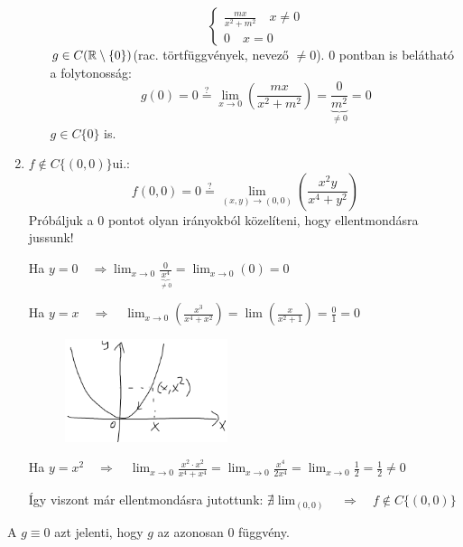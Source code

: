 \documentclass[a4paper,11.5pt]{article}
\begin{document}
\begin{task}
\begin{enumerate}
\begin{enumerate}
\[\begin{cases}
					\frac{mx}{x^2+m^2}\quad x\not=0\\
					0\quad x=0
				\end{cases} \]
				$g\in C(\mathbb{R}\setminus\{0\})$\quad (rac. törtfüggvények, nevező $\not=0$). $0$ pontban is belátható a folytonosság:
				\[ g(0)=0\overset{?}{=}\lim_{x\to0}\left(\frac{mx}{x^2+m^2}\right)=\frac{0}{\underbrace{m^2}_{\not=0}}=0 \]
				$g\in C\{0\}$ is.
			\end{enumerate}
			\item $f\notin C\{ (0,0) \}$\quad ui.:
			\[ f(0,0)=0\overset{?}{=}\lim_{(x,y)\to(0,0)}\left(\frac{x^2y}{x^4+y^2}\right) \]
			Próbáljuk a 0 pontot olyan irányokból közelíteni, hogy ellentmondásra jussunk!
			
			Ha $\displaystyle y=0\quad \Rightarrow\lim_{x\to0}\frac{0}{\underbrace{x^4}_{\not=0}}=\lim_{x\to0}(0)=0$
			
			Ha $\displaystyle y=x\quad \Rightarrow\quad \lim_{x\to0}\left(\frac{x^3}{x^4+x^2}\right)=\lim\left(\frac{x}{x^2+1}\right)=\frac{0}{1}=0$
			
			\begin{figure}[H]
				\centering
				\includegraphics[height=3cm]{../2zh/kepek/27.png}
				\caption{}
			\end{figure}
			Ha $\displaystyle y = x^2\quad \Rightarrow\quad \lim_{x\to0}\frac{x^2\cdot x^2}{x^4+x^4}=\lim_{x\to0}\frac{x^4}{2x^4}=\lim_{x\to0}\frac{1}{2}=\frac{1}{2}\not=0$
			
			Így viszont már ellentmondásra jutottunk: $\nexists\lim_{(0,0)}\quad \Rightarrow \quad f\notin C\{(0,0)\}$
		\end{enumerate}
		\begin{note}
			A $g\equiv0$ azt jelenti, hogy $g$ az azonosan 0 függvény.
		\end{note}
	\end{task}
\end{document}

